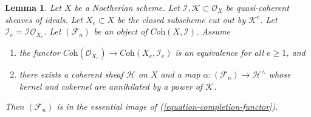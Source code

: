 \documentclass{stacks-project}
\theoremstyle{plain}
\newtheorem{lemma}[subsection]{Lemma}
\theoremstyle{definition}
\theoremstyle{remark}
\numberwithin{equation}{subsection}
\begin{document}
\begin{lemma}
\label{lemma-existence-tricky}
Let $X$ be a Noetherian scheme. Let
$\mathcal{I}, \mathcal{K} \subset \mathcal{O}_X$
be quasi-coherent sheaves of ideals.
Let $X_e \subset X$ be the closed subscheme cut out by $\mathcal{K}^e$.
Let $\mathcal{I}_e = \mathcal{I}\mathcal{O}_{X_e}$.
Let $(\mathcal{F}_n)$ be an object of $\textit{Coh}(X, \mathcal{I})$.
Assume
\begin{enumerate}
\item the functor
$\textit{Coh}(\mathcal{O}_{X_e}) \to \textit{Coh}(X_e, \mathcal{I}_e)$
is an equivalence for all $e \geq 1$, and
\item there exists a coherent sheaf $\mathcal{H}$ on $X$ and a map
$\alpha : (\mathcal{F}_n) \to \mathcal{H}^\wedge$ whose
kernel and cokernel are annihilated by a power of $\mathcal{K}$.
\end{enumerate}
Then $(\mathcal{F}_n)$ is in the essential image of
(\ref{equation-completion-functor}).
\end{lemma}
\end{document}
